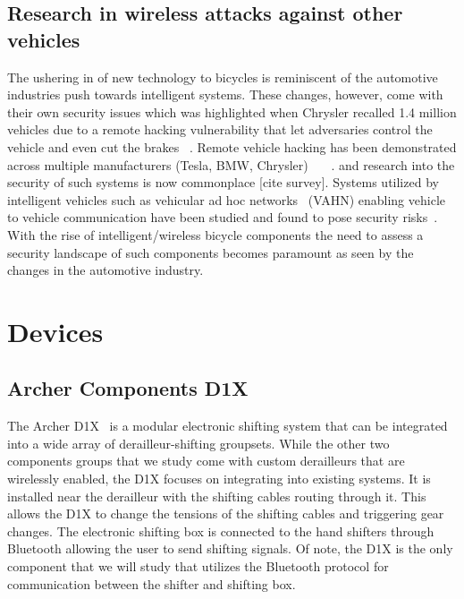 \documentclass[letterpaper,twocolumn,10pt]{article}
\begin{document}
\subsection{Research in wireless attacks against other vehicles}

The ushering in of new technology to bicycles is reminiscent of the automotive industries push towards intelligent systems. These changes, however, come with their own security issues which was highlighted when Chrysler recalled 1.4 million vehicles due to a remote hacking vulnerability that let adversaries control the vehicle and even cut the brakes ~\cite{ChryslerRecall}. Remote vehicle hacking has been demonstrated across multiple manufacturers (Tesla, BMW, Chrysler) ~\cite{Tesla}~\cite{BMW}~\cite{Chrysler}.  and research into the security of such systems is now commonplace [cite survey]. Systems utilized by intelligent vehicles such as vehicular ad hoc networks~\cite{ dibaei2019overview} (VAHN) enabling vehicle to vehicle communication have been studied and found to pose security risks~\cite{ SAKIZ201733}. With the rise of intelligent/wireless bicycle components the need to assess a security landscape of such components becomes paramount as seen by the changes in the automotive industry. 


\section{Devices}
\subsection{Archer Components D1X}

The Archer D1X~\cite{Archer} is a modular electronic shifting system that can be integrated into a wide array of derailleur-shifting groupsets. While the other two components groups that we study come with custom derailleurs that are wirelessly enabled, the D1X focuses on integrating into existing systems. It is installed near the derailleur with the shifting cables routing through it. This allows the D1X to change the tensions of the shifting cables and triggering gear changes. The electronic shifting box is connected to the hand shifters through Bluetooth allowing the user to send shifting signals. Of note, the D1X is the only component that we will study that utilizes the Bluetooth protocol for communication between the shifter and shifting box.
\end{document}
